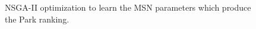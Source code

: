\documentclass[
  authoryear,
  preprint,
  3p]{elsarticle}
\begin{document}
\begin{figure}
\begin{minipage}{0.50\linewidth}
{}


\end{minipage}%

\caption{\label{fig-pymoo-parks}NSGA-II optimization to learn the MSN
parameters which produce the Park ranking.}

\end{figure}%


  
\end{document}
